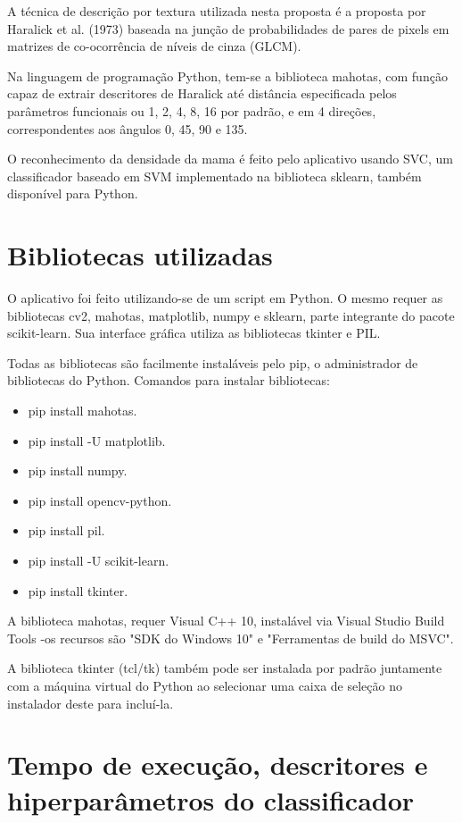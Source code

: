 A técnica de descrição por textura utilizada nesta proposta é a proposta por Haralick et al. (1973) baseada na junção de probabilidades de pares de pixels em matrizes de co-ocorrência de níveis de cinza (GLCM).

Na linguagem de programação Python, tem-se a biblioteca mahotas, com função capaz de extrair descritores de Haralick até distância especificada pelos parâmetros funcionais ou 1, 2, 4, 8, 16 por padrão, e em 4 direções, correspondentes aos ângulos 0, 45, 90 e 135.

O reconhecimento da densidade da mama é feito pelo aplicativo usando SVC, um classificador baseado em SVM implementado na biblioteca sklearn, também disponível para Python.

\section{\esp Bibliotecas utilizadas}
O aplicativo foi feito utilizando-se de um script em Python. O mesmo requer as bibliotecas cv2, mahotas, matplotlib, numpy e sklearn, parte integrante do pacote scikit-learn. Sua interface gráfica utiliza as bibliotecas tkinter e PIL.

Todas as bibliotecas são facilmente instaláveis pelo pip, o administrador de bibliotecas do Python.
Comandos para instalar bibliotecas:

\begin{itemize}
	\item pip install mahotas.
	\item pip install -U matplotlib.
	\item pip install numpy.
	\item pip install opencv-python.
	\item pip install pil.
	\item pip install -U scikit-learn.
	\item pip install tkinter.
\end{itemize}

A biblioteca mahotas, requer Visual C++ 10, instalável via Visual Studio Build Tools -os recursos são "SDK do Windows 10" e "Ferramentas de build do MSVC".

A biblioteca tkinter (tcl/tk) também pode ser instalada por padrão juntamente com a máquina virtual do Python ao selecionar uma caixa de seleção no instalador deste para incluí-la.


\section{\esp Tempo de execução, descritores e hiperparâmetros do classificador}

